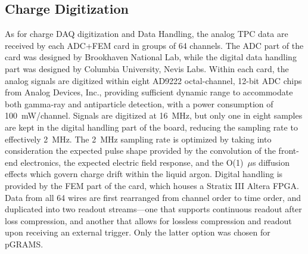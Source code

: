 \documentclass[a4paper,fleqn,longmktitle]{cas-dc}
\begin{document}
\subsection{Charge Digitization}\label{chap:DAQ:charge}
As for charge DAQ digitization and Data Handling, the analog TPC data are received by each ADC+FEM card in groups of 64 channels. The ADC part of the card was designed by Brookhaven National Lab, while the digital data handling part was designed by Columbia University, Nevis Labs. Within each card, the analog signals are digitized within eight AD9222 octal-channel, 12-bit ADC chips from Analog Devices, Inc., providing sufficient dynamic range to accommodate both gamma-ray and antiparticle detection, with a power consumption of 100~mW/channel. Signals are digitized at 16~MHz, but only one in eight samples are kept in the digital handling part of the board, reducing the sampling rate to effectively 2~MHz. The 2~MHz sampling rate is optimized by taking into consideration the expected pulse shape provided by the convolution of the front-end electronics, the expected electric field response, and the O(1)~$\mu$s diffusion effects which govern charge drift within the liquid argon. Digital handling is provided by the FEM part of the card, which houses a Stratix III Altera FPGA. Data from all 64 wires are first rearranged from channel order to time order, and duplicated into two readout streams---one that supports continuous readout after loss compression, and another that allows for lossless compression and readout upon receiving an external trigger. Only the latter option was chosen for pGRAMS. 
\end{document}
